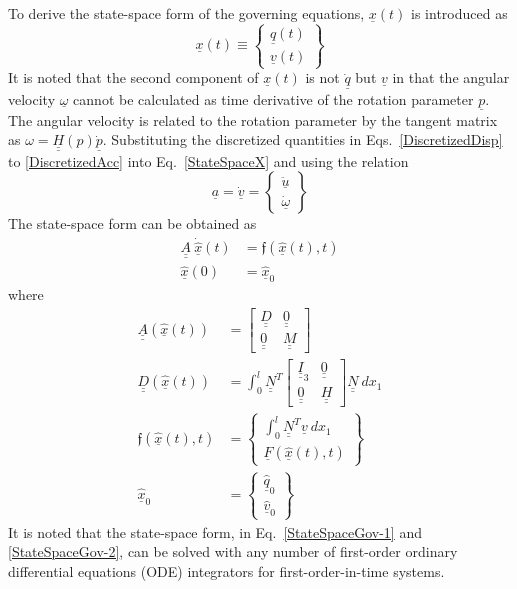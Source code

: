\documentclass{aiaa-tc}
\newcommand{\tens}[1]{\underline{\underline{#1}}}
\renewcommand{\vec}[1]{\underline{#1}}
\begin{document}
To derive the state-space form of the governing equations,  $\vec{x}(t)$ is introduced as
\begin{equation}
    \label{StateSpaceX}
    \vec{x}(t) \equiv \begin{Bmatrix}
    \vec{q}(t) \\
    \vec{v}(t)
    \end{Bmatrix} 
\end{equation}
It is noted that the second component of $\vec{x}(t)$ is not $\vec{\dot{q}}$ but $\vec{v}$ in that the angular velocity $\vec{\omega}$ cannot be calculated as time derivative of the rotation parameter $\vec{p}$. The angular velocity is related to the rotation parameter by the tangent matrix as $\omega = \tens{H}(p) \dot{\vec{p}}$. Substituting the discretized quantities in Eqs.~\eqref{DiscretizedDisp} to \eqref{DiscretizedAcc} into Eq.~\eqref{StateSpaceX} and using the relation
\begin{equation}
    \label{AccVel}
    \vec{a} = \vec{\dot{v}} = \begin{Bmatrix}
    \vec{\ddot{u}} \\
    \vec{\dot{\omega}}
    \end{Bmatrix}
\end{equation}
The state-space form can be obtained as
\begin{align}
    \label{StateSpaceGov-1}
    \tens{A} ~\dot{\hat{\vec{x}}}(t) &= \mathfrak{f}(\hat{\vec{x}}(t),t) \\
    \label{StateSpaceGov-2}
    \hat{\vec{x}}(0) &= \hat{\vec{x}}_0
\end{align}
where
\begin{align}
    \label{StateSpaceGov-3}
    \tens{A} (\hat{\vec{x}}(t)) &= \begin{bmatrix}
    \tens{D} & \tens{0} \\
    \tens{0} & \tens{M}
    \end{bmatrix}  \\
    \label{StateSpaceGov-4}
    \tens{D} (\hat{\vec{x}}(t)) &= \int_0^l \tens{N}^T \begin{bmatrix}
    \tens{I}_3 & \tens{0} \\
    \tens{0} & \tens{H}
    \end{bmatrix} 
    \tens{N}~dx_1 \\
    \label{StateSpaceGov-5}
    \mathfrak{f}(\hat{\vec{x}}(t),t) &=  \begin{Bmatrix}
    \int_0^l \tens{N}^T \vec{v}~dx_1 \\
    \vec{F}(\hat{\vec{x}}(t),t)
    \end{Bmatrix} \\
    \label{StateSpaceGov-7}
    \hat{\vec{x}}_0 &= \begin{Bmatrix}
    \hat{\vec{q}}_0 \\
    \hat{\vec{v}}_0
    \end{Bmatrix}
\end{align}
It is noted that the state-space form, in
Eq.~\eqref{StateSpaceGov-1} and \eqref{StateSpaceGov-2}, can be solved with
any number of first-order ordinary differential equations (ODE) integrators
for first-order-in-time systems. 
\end{document}
